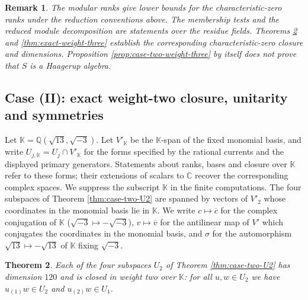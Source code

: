 \documentclass[leqno]{article}
\newcommand{\Cbb}{\ensuremath{\mathbb{C}}}
\newcommand{\K}{\ensuremath{\mathbb{K}}}
\newtheorem{thm}{Theorem}[section]
\newtheorem{remark}[thm]{Remark}
\numberwithin{equation}{section}
\begin{document}
\begin{remark}\normalfont
\label{rem:weight-three-meaning}
The modular ranks give lower bounds for the characteristic-zero ranks under the reduction conventions above. The membership tests and the reduced module decomposition are statements over the residue fields. Theorems \ref{thm:exact-weight-two} and \ref{thm:exact-weight-three} establish the corresponding characteristic-zero closure and dimensions. Proposition \ref{prop:case-two-weight-three} by itself does not prove that $S$ is a Haagerup algebra.
\end{remark}


\subsection{Case (II): exact weight-two closure, unitarity and symmetries}
\label{subsec:case-two-exact}

Let $\K = \mathbb{Q}(\sqrt{13},\sqrt{-3})$. Let $V'_{\K}$ be the $\K$-span of the fixed monomial basis, and write $U_{j,\K} = U_j \cap V'_{\K}$ for the forms specified by the rational currents and the displayed primary generators. Statements about ranks, bases and closure over $\K$ refer to these forms; their extensions of scalars to $\Cbb$ recover the corresponding complex spaces. We suppress the subscript $\K$ in the finite computations. The four subspaces of Theorem \ref{thm:case-two-U2} are spanned by vectors of $V'_2$ whose coordinates in the monomial basis lie in $\K$. We write $c \mapsto \overline{c}$ for the complex conjugation of $\K$ ($\sqrt{-3} \mapsto -\sqrt{-3}$), $v \mapsto \overline{v}$ for the antilinear map of $V'$ which conjugates the coordinates in the monomial basis, and $\sigma$ for the automorphism $\sqrt{13} \mapsto -\sqrt{13}$ of $\K$ fixing $\sqrt{-3}$.

\begin{thm}
\label{thm:exact-weight-two}
Each of the four subspaces $U_2$ of Theorem \ref{thm:case-two-U2} has dimension $120$ and is closed in weight two over $\K$: for all $u,w \in U_2$ we have $u_{(1)}w \in U_2$ and $u_{(2)}w \in U_1$.
\end{thm}
\end{document}
